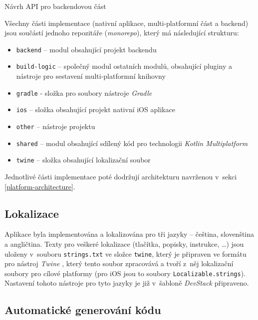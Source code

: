 Návrh API pro backendovou část 

Všechny části implementace (nativní aplikace, multi-platformní část a backend) jsou součástí jednoho repozitáře (\emph{monorepo}), který má následující strukturu:
\begin{itemize}
\item\texttt{backend} – modul obsahující projekt backendu
\item\texttt{build-logic} – společný modul ostatních modulů, obsahující pluginy a nástroje pro sestavení multi-platformní knihovny
\item\texttt{gradle} - složka pro soubory nástroje \emph{Gradle}
\item\texttt{ios} – složka obsahující projekt nativní iOS aplikace
\item\texttt{other} – nástroje projektu
\item\texttt{shared} – modul obsahující sdílený kód pro technologii \emph{Kotlin Multiplatform}
\item\texttt{twine} – složka obsahující lokalizační soubor
\end{itemize}
Jednotlivé části implementace poté dodržují architekturu navrženou v~sekci \ref{platform-architecture}.

\subsection{Lokalizace}

Aplikace byla implementována a lokalizována pro tři jazyky – čeština, slovenština a angličtina. Texty pro veškeré lokalizace (tlačítka, popisky, instrukce, \dots) jsou uloženy v~souboru \texttt{strings.txt} ve složce \texttt{twine}, který je připraven ve formátu pro nástroj \emph{Twine} \cite{twine}, který tento soubor zpracovává a tvoří z~něj lokalizační soubory pro cílové platformy (pro iOS jsou to soubory \texttt{Localizable.strings}). Nastavení tohoto nástroje pro tyto jazyky je již v~šabloně \emph{DevStack} připraveno.

\subsection{Automatické generování kódu}

